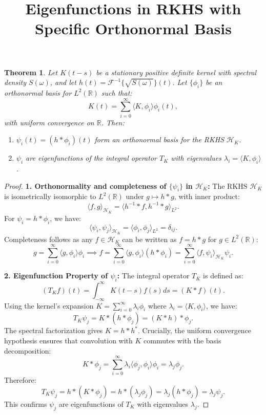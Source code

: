 \documentclass{article}
\title{Eigenfunctions in RKHS with Specific Orthonormal Basis}
\author{}
\date{}
\newtheorem{theorem}{Theorem}
\begin{document}
\maketitle

\begin{theorem}
Let $K(t-s)$ be a stationary positive definite kernel with spectral density $S(\omega)$, and let $h(t) = \mathcal{F}^{-1}\{\sqrt{S(\omega)}\}(t)$. Let $\{\phi_i\}$ be an orthonormal basis for $L^2(\mathbb{R})$ such that:  
\[
K(t) = \sum_{i=0}^\infty \langle K, \phi_i \rangle \phi_i(t),
\]  
with uniform convergence on $\mathbb{R}$. Then:  
\begin{enumerate}
    \item $\psi_i(t) = (h * \phi_i)(t)$ form an orthonormal basis for the RKHS $\mathcal{H}_K$.
    \item $\psi_i$ are eigenfunctions of the integral operator $T_K$ with eigenvalues $\lambda_i = \langle K, \phi_i \rangle$.
\end{enumerate}
\end{theorem}

\begin{proof}
\textbf{1. Orthonormality and completeness of $\{\psi_i\}$ in $\mathcal{H}_K$:}  
The RKHS $\mathcal{H}_K$ is isometrically isomorphic to $L^2(\mathbb{R})$ under $g \mapsto h * g$, with inner product:  
\[
\langle f, g \rangle_{\mathcal{H}_K} = \langle h^{-1} * f, h^{-1} * g \rangle_{L^2}.
\]  
For $\psi_i = h * \phi_i$, we have:  
\[
\langle \psi_i, \psi_j \rangle_{\mathcal{H}_K} = \langle \phi_i, \phi_j \rangle_{L^2} = \delta_{ij}.
\]  
Completeness follows as any $f \in \mathcal{H}_K$ can be written as $f = h * g$ for $g \in L^2(\mathbb{R})$:
\[
g = \sum_{i=0}^\infty \langle g, \phi_i \rangle \phi_i \implies f = \sum_{i=0}^\infty \langle g, \phi_i \rangle (h * \phi_i) = \sum_{i=0}^\infty \langle f, \psi_i \rangle_{\mathcal{H}_K} \psi_i.
\]  

\textbf{2. Eigenfunction Property of $\psi_i$:}  
The integral operator $T_K$ is defined as:  
\[
(T_K f)(t) = \int_{-\infty}^\infty K(t-s)f(s)ds = (K * f)(t).
\]  
Using the kernel's expansion $K = \sum_{i=0}^\infty \lambda_i \phi_i$ where $\lambda_i = \langle K, \phi_i \rangle$, we have:  
\[
T_K \psi_j = K * (h * \phi_j) = (K * h) * \phi_j.
\]  
The spectral factorization gives $K = h * h^*$. Crucially, the uniform convergence hypothesis ensures that convolution with $K$ commutes with the basis decomposition:
\[
K * \phi_j = \sum_{i=0}^\infty \lambda_i \langle \phi_j, \phi_i \rangle \phi_i = \lambda_j \phi_j.
\]  
Therefore:
\[
T_K \psi_j = h * (K * \phi_j) = h * (\lambda_j \phi_j) = \lambda_j (h * \phi_j) = \lambda_j \psi_j.
\]  
This confirms $\psi_j$ are eigenfunctions of $T_K$ with eigenvalues $\lambda_j$.  
\end{proof}
\end{document}
